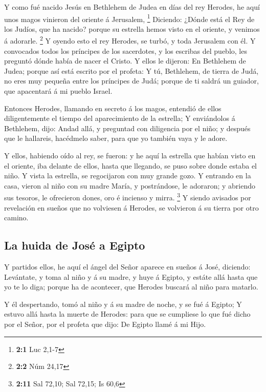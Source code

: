  Y como fué nacido Jesús en Bethlehem de Judea en días del
rey Herodes, he aquí unos magos vinieron del oriente á Jerusalem,
\footnote{\textbf{2:1} Luc 2,1-7}  Diciendo: ¿Dónde está el
Rey de los Judíos, que ha nacido? porque su estrella hemos visto en el
oriente, y venimos á adorarle. \footnote{\textbf{2:2} Núm 24,17}
 Y oyendo esto el rey Herodes, se turbó, y toda Jerusalem
con él.  Y convocados todos los príncipes de los sacerdotes,
y los escribas del pueblo, les preguntó dónde había de nacer el Cristo.
 Y ellos le dijeron: En Bethlehem de Judea; porque así está
escrito por el profeta:  Y tú, Bethlehem, de tierra de Judá,
no eres muy pequeña entre los príncipes de Judá; porque de ti saldrá un
guiador, que apacentará á mi pueblo Israel.

 Entonces Herodes, llamando en secreto á los magos, entendió
de ellos diligentemente el tiempo del aparecimiento de la estrella;
 Y enviándolos á Bethlehem, dijo: Andad allá, y preguntad
con diligencia por el niño; y después que le hallareis, hacédmelo saber,
para que yo también vaya y le adore.

 Y ellos, habiendo oído al rey, se fueron: y he aquí la
estrella que habían visto en el oriente, iba delante de ellos, hasta que
llegando, se puso sobre donde estaba el niño.  Y vista la
estrella, se regocijaron con muy grande gozo.  Y entrando
en la casa, vieron al niño con su madre María, y postrándose, le
adoraron; y abriendo sus tesoros, le ofrecieron dones, oro é incienso y
mirra. \footnote{\textbf{2:11} Sal 72,10; Sal 72,15; Is 60,6}
 Y siendo avisados por revelación en sueños que no
volviesen á Herodes, se volvieron á su tierra por otro camino.

\hypertarget{la-huida-de-josuxe9-a-egipto}{%
\subsection{La huida de José a
Egipto}\label{la-huida-de-josuxe9-a-egipto}}

 Y partidos ellos, he aquí el ángel del Señor aparece en
sueños á José, diciendo: Levántate, y toma al niño y á su madre, y huye
á Egipto, y estáte allá hasta que yo te lo diga; porque ha de acontecer,
que Herodes buscará al niño para matarlo.

 Y él despertando, tomó al niño y á su madre de noche, y se
fué á Egipto;  Y estuvo allá hasta la muerte de Herodes:
para que se cumpliese lo que fué dicho por el Señor, por el profeta que
dijo: De Egipto llamé á mi Hijo.

